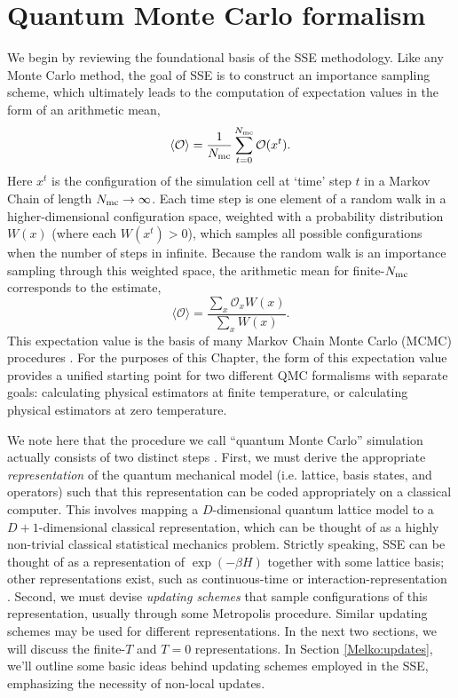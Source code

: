 \documentclass[vecphys]{svmult}
\begin{document}
\section{Quantum Monte Carlo formalism}

We begin by reviewing the foundational basis of the SSE methodology.  Like any Monte Carlo method, the goal of SSE is to construct an importance sampling scheme, which ultimately leads to the computation of expectation values in the form of an arithmetic mean,
\begin{equation}
\langle \mathcal{O} \rangle  = \frac{1}{N_{\rm mc}} \sum_{t=0}^{N_{\rm mc}} \mathcal{O}(x^t). \label{est1}
\end{equation}
Here $x^t$ is the configuration of the simulation cell at \lq time' step $t$ in a Markov Chain of length $N_{\rm mc} \rightarrow \infty$.
Each time step is one element of a random walk in a higher-dimensional configuration space, weighted with a probability distribution $W(x)$ (where each $W(x^t) > 0$), which samples all possible configurations when the number of steps in infinite.
Because the random walk is an importance sampling through this weighted space, the arithmetic mean for finite-$N_{\rm mc}$ corresponds to the estimate,
\begin{equation}
\langle \mathcal{O} \rangle  = \frac{\sum_x \mathcal{O}_x  W(x)}{\sum_x W(x)}. \label{est2}
\end{equation}
This expectation value is the basis of many Markov Chain Monte Carlo (MCMC) procedures \cite{Melko:Liu}.
For the purposes of this Chapter, the form of this expectation value provides a unified starting point
for two different QMC formalisms with separate goals: calculating physical estimators at finite temperature, or calculating physical estimators at zero temperature.  

We note here that the procedure we call ``quantum Monte Carlo'' simulation actually consists of two distinct steps \cite{Melko:Assaad07}.  First, we must derive the appropriate {\it representation} of the quantum mechanical model (i.e. lattice, basis states, and operators) such that this representation can be coded appropriately on a classical computer.
This involves mapping a $D$-dimensional quantum lattice model to a $D+1$-dimensional classical representation, which can be thought of as a highly non-trivial classical statistical mechanics problem.
Strictly speaking, SSE can be thought of as a representation of $\exp(-\beta H)$ together with some lattice basis; other representations exist, such as continuous-time or interaction-representation \cite{Melko:Assaad07}.
Second, we must devise {\it updating schemes} that sample configurations of this representation, usually through some Metropolis procedure.  Similar updating schemes may be used for different representations.
In the next two sections, we will discuss the finite-$T$ and $T=0$ representations.  In Section \ref{Melko:updates}, we'll outline some basic ideas behind updating schemes employed in the SSE, emphasizing the necessity of non-local updates.  
\end{document}
